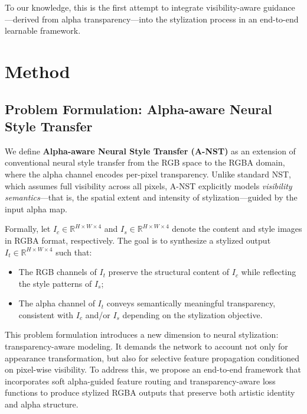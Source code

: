 \documentclass[letterpaper]{article} %
\begin{document}
To our knowledge, this is the first attempt to integrate visibility-aware guidance—derived from alpha transparency—into the stylization process in an end-to-end learnable framework.

\section{Method}

\subsection{Problem Formulation: Alpha-aware Neural Style Transfer}

We define \textbf{Alpha-aware Neural Style Transfer (A-NST)} as an extension of conventional neural style transfer from the RGB space to the RGBA domain, where the alpha channel encodes per-pixel transparency. Unlike standard NST, which assumes full visibility across all pixels, A-NST explicitly models \textit{visibility semantics}—that is, the spatial extent and intensity of stylization—guided by the input alpha map.

Formally, let $I_c \in \mathbb{R}^{H \times W \times 4}$ and $I_s \in \mathbb{R}^{H \times W \times 4}$ denote the content and style images in RGBA format, respectively. The goal is to synthesize a stylized output $I_t \in \mathbb{R}^{H \times W \times 4}$ such that:
\begin{itemize}
    \item The RGB channels of $I_t$ preserve the structural content of $I_c$ while reflecting the style patterns of $I_s$;
    
    \item The alpha channel of $I_t$ conveys semantically meaningful transparency, consistent with $I_c$ and/or $I_s$ depending on the stylization objective.
\end{itemize}

This problem formulation introduces a new dimension to neural stylization: transparency-aware modeling. It demands the network to account not only for appearance transformation, but also for selective feature propagation conditioned on pixel-wise visibility. To address this, we propose an end-to-end framework that incorporates soft alpha-guided feature routing and transparency-aware loss functions to produce stylized RGBA outputs that preserve both artistic identity and alpha structure.

\end{document}
